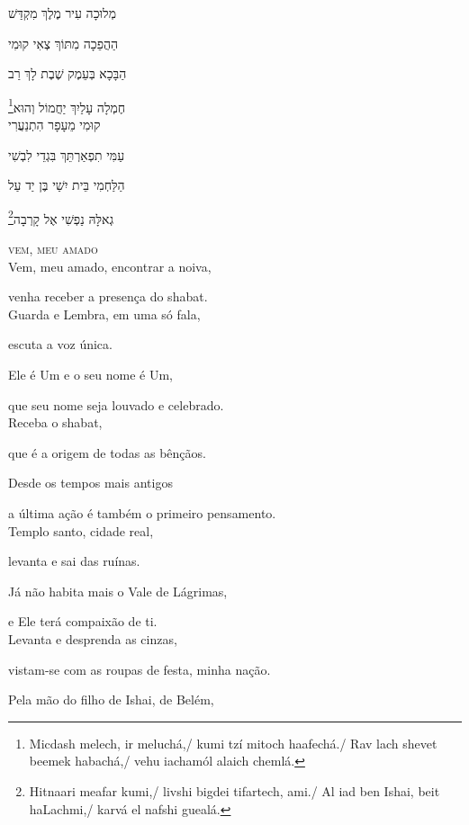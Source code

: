 מְלוּכָה עִיר מֶלֶךְ  מִקְדַּשׁ

הַהֲפֵכָה מִתּוֹךְ צְאִי קוּמִי 

הַבָּכָא בְּעֵמֶק שֶׁבֶת  לָךְ רַב

\footnote{Micdash melech, ir meluchá,/ kumi tzí mitoch haafechá./ Rav lach shevet beemek habachá,/ vehu iachamól alaich chemlá.}חֶמְלָה עָלַיִךְ יַחֲמוֹל  וְהוּא\\[10pt]

קוּמִי מֵעָפָר הִתְנַעֲרִי

עַמִּי תִפְאַרְתֵּךְ בִּגְדֵי לִבְשִׁי 

הַלַּחְמִי בֵּית יִשַׁי בֶּן יַד עַל

\footnote{Hitnaari meafar kumi,/ livshi bigdei tifartech, ami./ Al iad ben Ishai, beit haLachmi,/ karvá el nafshi guealá.}גְאלָּהּ נַפְשִׁי אֶל קָרְבָה\\[10pt]


\movetooddpage
\raggedright

\vspace*{1cm}
\textsc{vem, meu amado}\\[15pt]


Vem, meu amado, encontrar a noiva,

venha receber a presença do shabat.\\[10pt]

Guarda e Lembra, em uma só fala,

escuta a voz única.

Ele é Um e o seu nome é Um,

que seu nome seja louvado e celebrado.\\[10pt]

Receba o shabat,

que é a origem de todas as bênçãos.

Desde os tempos mais antigos

a última ação é também o primeiro pensamento.\\[10pt]

Templo santo, cidade real,

levanta e sai das ruínas.

Já não habita mais o Vale de Lágrimas,

e Ele terá compaixão de ti.\\[10pt]

Levanta e desprenda as cinzas,

vistam-se com as roupas de festa, minha nação.

Pela mão do filho de Ishai, de Belém,

